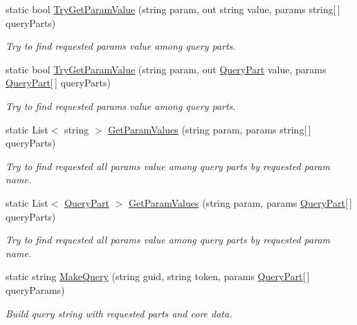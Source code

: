 \begin{DoxyCompactItemize}
static bool \mbox{\hyperlink{class_uniform_queries_1_1_a_p_i_a5747ff73a111b583fa01c442ca2a2d78}{Try\+Get\+Param\+Value}} (string param, out string value, params string\mbox{[}$\,$\mbox{]} query\+Parts)
\begin{DoxyCompactList}\small\item\em Try to find requested param\textquotesingle{}s value among query parts. \end{DoxyCompactList}\item 
static bool \mbox{\hyperlink{class_uniform_queries_1_1_a_p_i_a57f11d169fede8dc343e8fcce0af1c6a}{Try\+Get\+Param\+Value}} (string param, out \mbox{\hyperlink{struct_uniform_queries_1_1_query_part}{Query\+Part}} value, params \mbox{\hyperlink{struct_uniform_queries_1_1_query_part}{Query\+Part}}\mbox{[}$\,$\mbox{]} query\+Parts)
\begin{DoxyCompactList}\small\item\em Try to find requested param\textquotesingle{}s value among query parts. \end{DoxyCompactList}\item 
static List$<$ string $>$ \mbox{\hyperlink{class_uniform_queries_1_1_a_p_i_aa8a8215bbad2752c291803011dc49ff4}{Get\+Param\+Values}} (string param, params string\mbox{[}$\,$\mbox{]} query\+Parts)
\begin{DoxyCompactList}\small\item\em Try to find requested all param\textquotesingle{}s value among query parts by requested param name. \end{DoxyCompactList}\item 
static List$<$ \mbox{\hyperlink{struct_uniform_queries_1_1_query_part}{Query\+Part}} $>$ \mbox{\hyperlink{class_uniform_queries_1_1_a_p_i_ae481c9b7a800886a2b461a7456043494}{Get\+Param\+Values}} (string param, params \mbox{\hyperlink{struct_uniform_queries_1_1_query_part}{Query\+Part}}\mbox{[}$\,$\mbox{]} query\+Parts)
\begin{DoxyCompactList}\small\item\em Try to find requested all param\textquotesingle{}s value among query parts by requested param name. \end{DoxyCompactList}\item 
static string \mbox{\hyperlink{class_uniform_queries_1_1_a_p_i_a132ca74ba34302f216b61668dd32a207}{Make\+Query}} (string guid, string token, params \mbox{\hyperlink{struct_uniform_queries_1_1_query_part}{Query\+Part}}\mbox{[}$\,$\mbox{]} query\+Params)
\begin{DoxyCompactList}\small\item\em Build query string with requested parts and core data. \end{DoxyCompactList}\item 

\end{DoxyCompactItemize}

